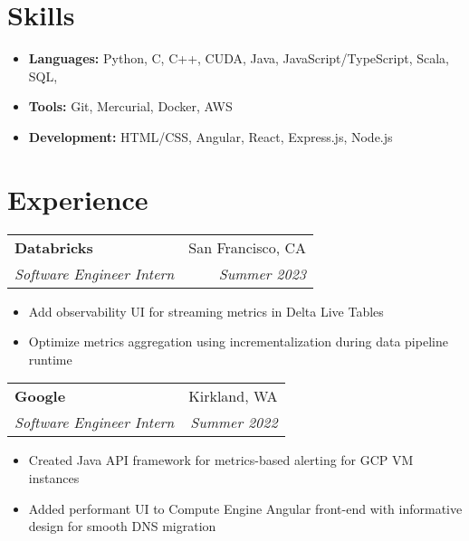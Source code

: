 \documentclass[letterpaper,11pt]{article}
\makeatletter
\newcommand{\resitem}[1]{\item[--] #1}
\newcommand{\ressubheading}[4]{
	\vspace{3pt}
	\begin{tabular*}{7.5in}{l@{\extracolsep{\fill}}r}
			\textbf{#1} & #2 \\
			\textit{#3} & \textit{#4}
	\end{tabular*}
}
\makeatother
\begin{document}


\section{Skills}

\begin{itemize}
	\resitem{
		\textbf{Languages:}
		Python,
		C,
		C++,
		CUDA,
		Java,
		JavaScript/TypeScript,
		Scala,
		SQL,
	}
	\resitem{
		\textbf{Tools:}
		Git,
		Mercurial,
		Docker,
		AWS
	}
	\resitem{
		\textbf{Development:}
		HTML/CSS,
		Angular,
		React,
		Express.js,
		Node.js
	}
\end{itemize}

\section{Experience}

\ressubheading{Databricks}{San Francisco, CA}{Software Engineer Intern}{Summer 2023}
\begin{itemize}
	\resitem{Add observability UI for streaming metrics in Delta Live Tables}
	\resitem{Optimize metrics aggregation using incrementalization during data pipeline runtime}
\end{itemize}

\ressubheading{Google}
{Kirkland, WA}
{Software Engineer Intern}
{Summer 2022}
\begin{itemize}
	\resitem{
		Created Java API framework for metrics-based alerting for GCP VM instances
	}
	\resitem{
		Added performant UI to Compute Engine Angular front-end with informative design for
		smooth DNS migration
	}
\end{itemize}
\end{document}

